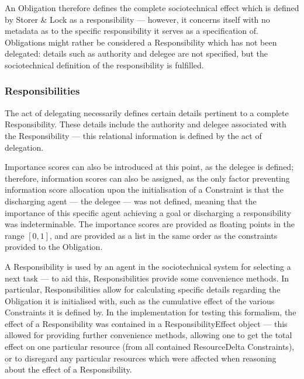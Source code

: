 An Obligation therefore defines the complete sociotechnical effect which is defined by Storer \& Lock as a responsibility --- however, it concerns itself with no metadata as to the specific responsibility it serves as a specification of. Obligations might rather be considered a Responsibility which has not been delegated: details such as authority and delegee are not specified, but the sociotechnical definition of the responsibility is fulfilled.\par

\subsubsection{Responsibilities}  %
The act of delegating necessarily defines certain details pertinent to a complete Responsibility. These details include the authority and delegee associated with the Responsibility --- this relational information is defined by the act of delegation.\par

Importance scores can also be introduced at this point, as the delegee is defined; therefore, information scores can also be assigned, as the only factor preventing information score allocation upon the initialisation of a Constraint is that the discharging agent --- the delegee --- was not defined, meaning that the importance of this specific agent achieving a goal or discharging a responsibility was indeterminable. The importance scores are provided as floating points in the range \([0,1]\), and are provided as a list in the same order as the constraints provided to the Obligation.\par

A Responsibility is used by an agent in the sociotechnical system for selecting a next task --- to aid this, Responsibilities provide some convenience methods. In particular, Responsibilities allow for calculating specific details regarding the Obligation it is initialised with, such as the cumulative effect of the various Constraints it is defined by. In the implementation for testing this formalism, the effect of a Responsibility was contained in a ResponsibilityEffect object --- this allowed for providing further convenience methods, allowing one to get the total effect on one particular resource (from all contained ResourceDelta Constraints), or to disregard any particular resources which were affected when reasoning about the effect of a Responsibility.\par

